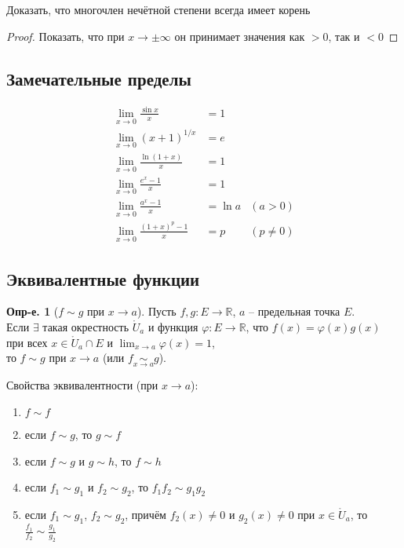 \documentclass[a4paper,12pt]{article}
\numberwithin{figure}{section}
\theoremstyle{definition}
\newtheorem{definition}{Опр-е.}[section]
\theoremstyle{definition}
\def\DS{\displaystyle}
\def\RR{\mathbb{R}}
\def\on{\!:}
\def\ringU{\mathring{U}}
\begin{document}
\bigskip
\begin{problem}Доказать, что многочлен нечётной степени всегда имеет корень\end{problem}
\begin{proof}Показать, что при $x\to\pm\infty$ он принимает значения как $>0$, так и $<0$\end{proof}


\subsection{Замечательные пределы}

\begin{align*}
	   \lim_{x\to 0} \frac{\sin x}x &= 1
	\\ \lim_{x\to 0} \left(x+1\right)^{1/x} &= e
	\\ \lim_{x\to 0} \frac{\ln(1+x)}x &= 1
	\\ \lim_{x\to 0} \frac{e^x-1}x &= 1
	\\ \lim_{x\to 0} \frac{a^x-1}x &= \ln a    &(a>0)
	\\ \lim_{x\to 0} \frac{(1+x)^p-1}x &= p   &(p \ne 0)
\end{align*}


\subsection{Эквивалентные функции}

\begin{definition}[$f \sim g$ при $x \to a$]
	Пусть $f,g\on E\to \RR$, $a$ -- предельная точка $E$. \\
	Если $\exists$ такая окрестность $\ringU_a$ и функция $\varphi\on E\to\RR$,
	что $f(x)=\varphi(x)g(x)$ при всех $x\in\ringU_a\cap E$
	и $\DS \lim_{x\to a}\varphi(x)=1$,\\
	то $f \sim g$ при $x\to a$ (или $\DS f \underset{x\to a}{\sim} g$).
\end{definition}

\medskip
Свойства эквивалентности (при $x \to a$): \begin{enumerate}
	\item $f \sim f$
	\item если $f \sim g$, то $g \sim f$
	\item если $f \sim g$ и $g \sim h$, то $f \sim h$
	\item если $f_1 \sim g_1$ и $f_2 \sim g_2$, то $f_1 f_2 \sim g_1 g_2$
	\item если $f_1 \sim g_1$, $f_2 \sim g_2$, причём
		  $f_2(x)\ne0$ и $g_2(x)\ne0$ при $x\in \ringU_a$,
		  то $\DS \frac{f_1}{f_2} \sim \frac{g_1}{g_2}$
\end{enumerate}
\end{document}
